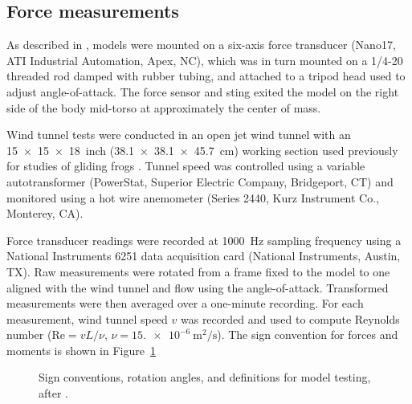 %

\subsection{Force measurements}
As described in \citep{Koehl:2012}, models were mounted on a six-axis force transducer (Nano17, ATI Industrial Automation, Apex, NC), which was in turn mounted on a 1/4-20 threaded rod damped with rubber tubing, and attached to a tripod head used to adjust angle-of-attack.  The force sensor and sting exited the model on the right side of the body mid-torso at approximately the center of mass.

Wind tunnel tests were conducted in an open jet wind tunnel with an \SI{15 x 15 x 18}{inch} (\SI{38.1 x 38.1 x 45.7}{\centi\meter}) working section used previously for studies of gliding frogs \citep{McCay:2001, McCay:2001a}.  Tunnel speed was controlled using a variable autotransformer (PowerStat, Superior Electric Company, Bridgeport, CT) and monitored using a hot wire anemometer (Series 2440, Kurz Instrument Co., Monterey, CA).  

Force transducer readings were recorded at \SI{1000}{\hertz} sampling frequency using a National Instruments 6251 data acquisition card (National Instruments, Austin, TX).  Raw measurements were rotated from a frame fixed to the model to one aligned with the wind tunnel and flow using the angle-of-attack.  Transformed measurements were then averaged over a one-minute recording.  For each measurement, wind tunnel speed $v$ was recorded and used to compute Reynolds number ($\mbox{Re} = vL/\nu$, $\nu = \SI{15.e-6}{\meter\squared\per\second}$).  The sign convention for forces and moments is shown in Figure~\ref{fig:signconvention}

\begin{figure}
\caption{%
{Sign conventions, rotation angles, and definitions for model testing, after \citep{Emerson:1990b,McCay:2001,McCay:2001a,McCormick:1995}.}%
}
\label{fig:signconvention}
\end{figure}  

